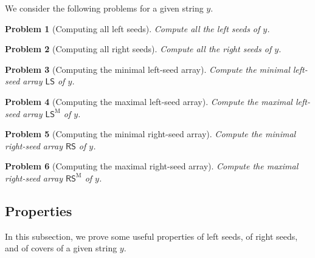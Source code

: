 \documentclass[preprint,12pt]{elsarticle}
\newcommand{\sarr}{\textsf{LS}}      %
\newcommand{\rsarr}{\textsf{RS}}      %
\newcommand{\smarr}{\textsf{LS}^\mathrm{M}}      %
\newcommand{\rsmarr}{\textsf{RS}^\mathrm{M}}      %
\newtheorem{problem}{Problem}
\begin{document}
\bigskip
We consider the following problems for a given string $y$.
%
\begin{problem}[Computing all left seeds]
\label{problem all ls}
Compute all the left seeds of $y$.
\end{problem}
%
\begin{problem}[Computing all right seeds]
\label{problem all rs}
Compute all the right seeds of $y$.
\end{problem}
%
\begin{problem}[Computing the minimal left-seed array]
\label{problem min LS}
Compute the minimal left-seed array $\sarr$ of $y$.
\end{problem}
%
\begin{problem}[Computing the maximal left-seed array]
\label{problem max LS}
Compute the maximal left-seed array $\smarr$ of $y$.
\end{problem}
%
\begin{problem}[Computing the minimal right-seed array]
\label{problem min RS}
Compute the minimal right-seed array $\rsarr$ of $y$.
\end{problem}
%
\begin{problem}[Computing the maximal right-seed array]
\label{problem max RS}
Compute the maximal right-seed array $\rsmarr$ of $y$.
\end{problem}



\subsection{Properties}\label{sec:properties}

In this subsection, we prove some useful properties of left seeds, of right seeds, and of covers of a given string $y$. 

\end{document}
